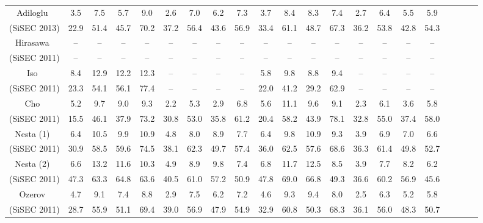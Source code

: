 \documentclass{article}
\begin{document}
\begin{table*}[t]
\begin{center}
{\begin{tabular}{|c|cccc|cccc|cccc|cccc|cccc|}
			\multirow{1}{*}{Adiloglu~\cite{Adiloglu}}		&	3.5	&	7.5	&	5.7	&	9.0			&	2.6	&	7.0	&	6.2	&	7.3			&	3.7	&	8.4	&	8.3	&	7.4		&	2.7	&	6.4	&	5.5	&	5.9	\\
			\multirow{1}{*}{(SiSEC 2013)}			&	22.9	&	51.4	&	45.7	&	70.2			&	37.2	&	56.4	&	43.6	&	56.9			&	33.4	&	61.1	&	48.7	&	67.3		&	36.2	&	53.8	&	42.8	&	54.3	\\ \hline
			\multirow{1}{*}{Hirasawa~\cite{Hirasawa}}	&	--	&	--	&	--	&	--			&	--	&	--	&	--	&	--			&	--	&	--	&	--	&	--		&	--	&	--	&	--	&	--	\\
			\multirow{1}{*}{(SiSEC 2011)}			&	--	&	--	&	--	&	--			&	--	&	--	&	--	&	--			&	--	&	--	&	--	&	--		&	--	&	--	&	--	&	--	\\ \hline
			\multirow{1}{*}{Iso~\cite{Iso}}				&	8.4	&	12.9	&	12.2	&	12.3			&	--	&	--	&	--	&	--			&	5.8	&	9.8	&	8.8	&	9.4		&	--	&	--	&	--	&	--	\\
			\multirow{1}{*}{(SiSEC 2011)}			&	23.3	&	54.1	&	56.1	&	77.4			&	--	&	--	&	--	&	--			&	22.0	&	41.2	&	29.2	&	62.9		&	--	&	--	&	--	&	--	\\ \hline
			\multirow{1}{*}{Cho~\cite{Cho2}}			&	5.2	&	9.7	&	9.0	&	9.3			&	2.2	&	5.3	&	2.9	&	6.8			&	5.6	&	11.1	&	9.6	&	9.1		&	2.3	&	6.1	&	3.6	&	5.8	\\
			\multirow{1}{*}{(SiSEC 2011)}			&	15.5	&	46.1	&	37.9	&	73.2			&	30.8	&	53.0	&	35.8	&	61.2			&	20.4	&	58.2	&	43.9	&	78.1		&	32.8	&	55.0	&	37.4	&	58.0	\\ \hline
			\multirow{1}{*}{Nesta (1)~\cite{Nesta}}	&	6.4	&	10.5	&	9.9	&	10.9			&	4.8	&	8.0	&	8.9	&	7.7			&	6.4	&	9.8	&	10.9	&	9.3		&	3.9	&	6.9	&	7.0	&	6.6	\\
			\multirow{1}{*}{(SiSEC 2011)}			&	30.9	&	58.5	&	59.6	&	74.5			&	38.1	&	62.3	&	49.7	&	57.4			&	36.0	&	62.5	&	57.6	&	68.6		&	36.3	&	61.4	&	49.8	&	52.7	\\ \hline
			\multirow{1}{*}{Nesta (2)~\cite{Nesta}}	&	6.6	&	13.2	&	11.6	&	10.3			&	4.9	&	8.9	&	9.8	&	7.4			&	6.8	&	11.7	&	12.5	&	8.5		&	3.9	&	7.7	&	8.2	&	6.2	\\
			\multirow{1}{*}{(SiSEC 2011)}			&	47.3	&	63.3	&	64.8	&	63.6			&	40.5	&	61.0	&	57.2	&	50.9			&	47.8	&	69.0	&	66.8	&	49.3		&	36.6	&	60.2	&	56.9	&	45.6	\\ \hline
			\multirow{1}{*}{Ozerov~\cite{Ozerov}}		&	4.7	&	9.1	&	7.4	&	8.8			&	2.9	&	7.5	&	6.2	&	7.2			&	4.6	&	9.3	&	9.4	&	8.0		&	2.5	&	6.3	&	5.2	&	5.8	\\
			\multirow{1}{*}{(SiSEC 2011)}			&	28.7	&	55.9	&	51.1	&	69.4			&	39.0	&	56.9	&	47.9	&	54.9			&	32.9	&	60.8	&	50.3	&	68.3		&	36.1	&	56.0	&	48.3	&	50.7	\\ \hline
		\end{tabular}
	}
	\end{center}
	\label{UND-test-130ms-5cm}
\end{table*}
\end{document}
